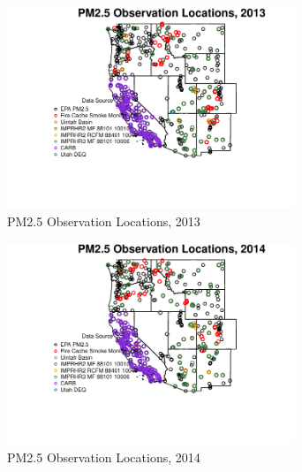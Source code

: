 \begin{figure} 
\centering  
\includegraphics[width=0.77\textwidth]{Code_Outputs/MapPM25_All_SitesY2013_ObsMapY2013.pdf} 
\caption{\label{fig:MapPM25_All_SitesY2013ObsMapY2013}PM2.5 Observation Locations, 2013} 
\end{figure} 
 

\begin{figure} 
\centering  
\includegraphics[width=0.77\textwidth]{Code_Outputs/MapPM25_All_SitesY2014_ObsMapY2014.pdf} 
\caption{\label{fig:MapPM25_All_SitesY2014ObsMapY2014}PM2.5 Observation Locations, 2014} 
\end{figure} 
 
